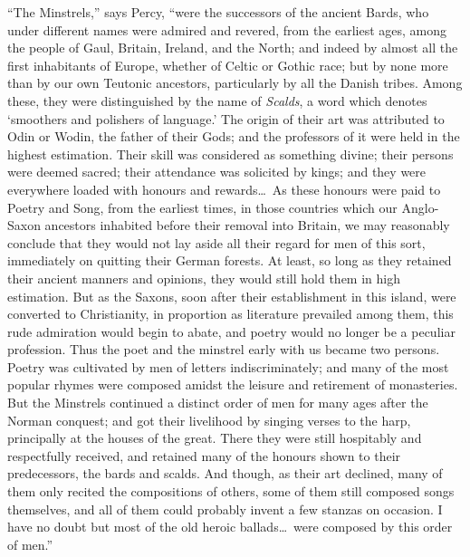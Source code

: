 “The Minstrels,” says Percy, “were the successors of the ancient Bards, who
under different names were admired and revered, from the earliest ages, among
the people of Gaul, Britain, Ireland, and the North; and indeed by almost all
the first inhabitants of Europe, whether of Celtic or Gothic race; but by none
more than by our own Teutonic ancestors, particularly by all the Danish tribes.
Among these, they were distinguished by the name of \textit{Scalds}, a word which
denotes ‘smoothers and polishers of language.’ The origin of their art was
attributed to Odin or Wodin, the father of their Gods; and the professors of it
were held in the highest estimation. Their skill was considered as something
divine; their persons were deemed sacred; their attendance was solicited by kings;
and they were everywhere loaded with honours and rewards\ldots\  As these
honours were paid to Poetry and Song, from the earliest times, in those countries
which our Anglo-Saxon ancestors inhabited before their removal into Britain, we
may reasonably conclude that they would not lay aside all their regard for men
of this sort, immediately on quitting their German forests. At least, so long as
they retained their ancient manners and opinions, they would still hold them in
high estimation. But as the Saxons, soon after their establishment in this
island, were converted to Christianity, in proportion as literature prevailed among 
them, this rude admiration would begin to \pagebreak
abate, and poetry would no longer be a 
peculiar profession. Thus the poet and the minstrel early with us became two 
persons. Poetry was cultivated by men of letters indiscriminately; and many of
the most popular rhymes were composed amidst the leisure and retirement of
monasteries. But the Minstrels continued a distinct order of men for many ages
after the Norman conquest; and got their livelihood by singing verses to the
harp, principally at the houses of the great. There they were still hospitably
and respectfully received, and retained many of the honours shown to their predecessors, 
the bards and scalds. And though, as their art declined, many of
them only recited the compositions of others, some of them still composed songs
themselves, and all of them could probably invent a few stanzas on occasion.
I have no doubt but most of the old heroic ballads\ldots\  were composed by this
order of men.”



